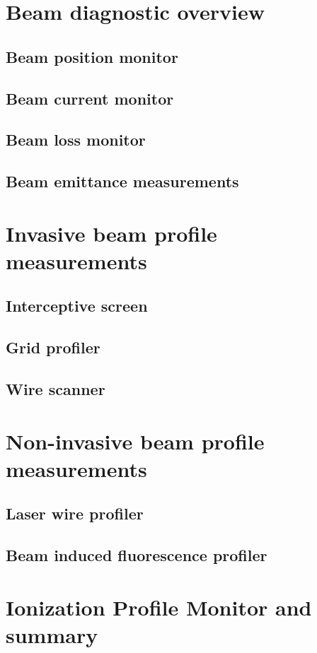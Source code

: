 \begin{refsection}
	\section{Beam diagnostic overview}
	\subsection{Beam position monitor}
	\subsection{Beam current monitor}
	\subsection{Beam loss monitor}
	\subsection{Beam emittance measurements}
  \section{Invasive beam profile measurements}
  \subsection{Interceptive screen}
	\subsection{Grid profiler}
	\subsection{Wire scanner}
	\section{Non-invasive beam profile measurements}
	\subsection{Laser wire profiler}
	\subsection{Beam induced fluorescence profiler}
	\section{Ionization Profile Monitor and summary}
	\label{ch2:Summary}
	\printbibliography[heading=subbibliography]
\end{refsection}